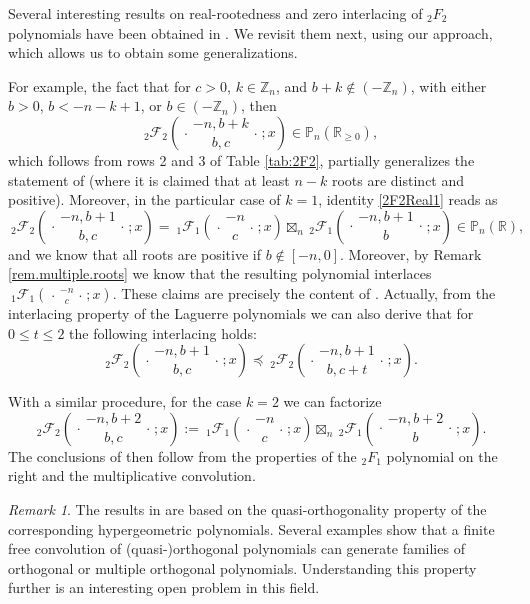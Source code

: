 \documentclass[reqno,11pt]{amsart}
\theoremstyle{remark}
\newtheorem{remark}[theorem]{Remark}
\renewcommand{\P}{\mathbb{P}}
\newcommand{\rr}{\mathbb{R}}
\newcommand{\zz}{\mathbb{Z}}
\newcommand*\pFq[5]{%
 {\ }_{#1}{\mathcal F}_{#2}{\left(\genfrac..{0pt}{}{#3}{#4};#5\right)}%
}
\begin{document}
\medskip

Several interesting results on real-rootedness and zero interlacing of ${}_2 F_2$ polynomials have been obtained in \cite[Section 2]{johnston2015quasi}. We revisit them next, using our approach, which allows us to obtain some generalizations.

For example, the fact that for $c>0$, $k\in \zz_n$, and $ b+k \notin (-\zz_n)$, with either $b> 0$, $b < -n-k+1$, or $b\in (-\zz_n)$, then 
$$\pFq{2}{2}{-n,  b+k}{ b, c}{x}\in \P_n(\rr_{\geq 0}),
$$
which follows from rows 2 and 3 of Table \ref{tab:2F2}, partially generalizes the statement of \cite[Theorem 2.2]{johnston2015quasi} (where it is claimed that at least $n-k$ roots are distinct and positive). Moreover, in the particular case of $k=1$, identity \eqref{2F2Real1} reads as  
$$\pFq{2}{2}{-n,  b+1}{ b, c}{x}=\pFq{1}{1}{-n}{c}{x}\boxtimes_n \pFq{2}{1}{-n,  b+1}{ b}{x} \in \P_n(\rr),$$
and we know that all roots are positive if $b\notin [-n,0]$. Moreover, by Remark \ref{rem.multiple.roots} we know that the resulting polynomial interlaces $\pFq{1}{1}{-n}{c}{x}$. These claims are precisely the content of \cite[Theorem 2.3]{johnston2015quasi}. Actually, from the interlacing property of the Laguerre polynomials we can also derive that for $0\leq t \leq 2$ the following interlacing holds:
$$\pFq{2}{2}{-n,  b+1}{ b, c}{x} \preccurlyeq \pFq{2}{2}{-n,  b+1}{ b, c+t}{x}.$$

With a similar procedure, for the case $k=2$ we can factorize 
$$\pFq{2}{2}{-n,  b+2}{ b, c}{x}:=\pFq{1}{1}{-n}{c}{x}\boxtimes_n \pFq{2}{1}{-n,  b+2}{ b}{x}.$$
The conclusions of \cite[Theorem 2.4]{johnston2015quasi} then follow from the properties of the ${}_2 F_1$ polynomial on the right and the multiplicative convolution.

\begin{remark}
    The results in \cite{johnston2015quasi} are based on the quasi-orthogonality property of the corresponding hypergeometric polynomials. Several examples show that a finite free convolution of (quasi-)orthogonal polynomials can generate families of orthogonal or multiple orthogonal polynomials. Understanding this property further is an interesting open problem in this field.
\end{remark}
\end{document}
